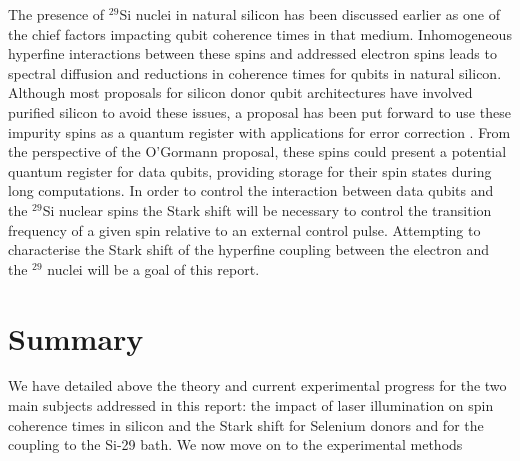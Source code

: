 The presence of $^{29}$Si nuclei in natural silicon has been discussed earlier as one of the chief factors impacting qubit coherence times in that medium.
Inhomogeneous hyperfine interactions between these spins and addressed electron spins leads to spectral diffusion and reductions in coherence times for qubits in natural silicon.
Although most proposals for silicon donor qubit architectures have involved purified silicon to avoid these issues, a proposal has been put forward to use these impurity spins as a quantum register with applications for error correction \cite{Wolfowicz2016a}.
From the perspective of the O'Gormann proposal, these spins could present a potential quantum register for data qubits, providing storage for their spin states during long computations.
In order to control the interaction between data qubits and the $^{29}$Si nuclear spins the Stark shift will be necessary to control the transition frequency of a given spin relative to an external control pulse.
Attempting to characterise the Stark shift of the hyperfine coupling between the electron and the $^{29}$ nuclei will be a goal of this report.



\section{Summary}

We have detailed above the theory and current experimental progress for the two main subjects addressed in this report: the impact of laser illumination on spin coherence times in silicon and the Stark shift for Selenium donors and for the coupling to the Si-29 bath.
We now move on to the experimental methods 
